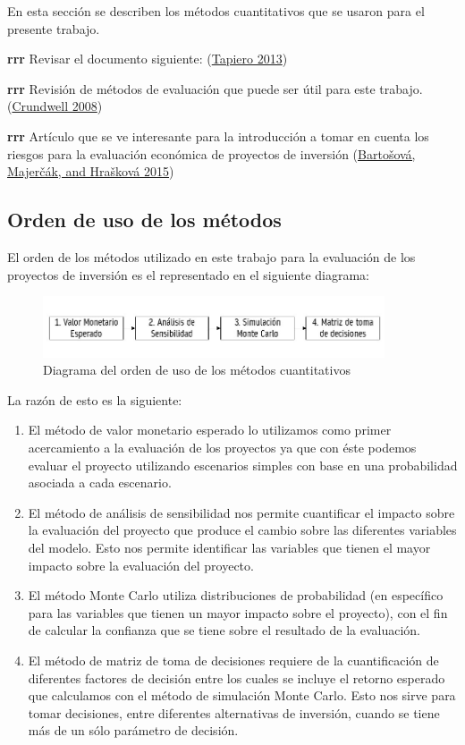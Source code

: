 \documentclass[
]{book}
\providecommand{\tightlist}{%
  \setlength{\itemsep}{0pt}\setlength{\parskip}{0pt}}
\begin{document}
En esta sección se describen los métodos cuantitativos que se usaron para el presente trabajo.

\textbf{rrr} Revisar el documento siguiente: (\protect\hyperlink{ref-Tapiero2013}{Tapiero 2013})

\textbf{rrr} Revisión de métodos de evaluación que puede ser útil para este trabajo. (\protect\hyperlink{ref-Crundwell2008}{Crundwell 2008})

\textbf{rrr} Artículo que se ve interesante para la introducción a tomar en cuenta los riesgos para la evaluación económica de proyectos de inversión (\protect\hyperlink{ref-Bartovsova2015}{Bartošová, Majerčák, and Hrašková 2015})

\hypertarget{orden-de-uso-de-los-muxe9todos}{%
\subsection{Orden de uso de los métodos}\label{orden-de-uso-de-los-muxe9todos}}

El orden de los métodos utilizado en este trabajo para la evaluación de los proyectos de inversión es el representado en el siguiente diagrama:

\begin{figure}
\centering
\includegraphics[width=0.9\textwidth,height=\textheight]{Diagramas/OrdenMetodos.jpg}
\caption{Diagrama del orden de uso de los métodos cuantitativos}
\end{figure}

La razón de esto es la siguiente:

\begin{enumerate}
\def\labelenumi{\arabic{enumi}.}
\tightlist
\item
  El método de valor monetario esperado lo utilizamos como primer acercamiento a la evaluación de los proyectos ya que con éste podemos evaluar el proyecto utilizando escenarios simples con base en una probabilidad asociada a cada escenario.
\item
  El método de análisis de sensibilidad nos permite cuantificar el impacto sobre la evaluación del proyecto que produce el cambio sobre las diferentes variables del modelo. Esto nos permite identificar las variables que tienen el mayor impacto sobre la evaluación del proyecto.
\item
  El método Monte Carlo utiliza distribuciones de probabilidad (en específico para las variables que tienen un mayor impacto sobre el proyecto), con el fin de calcular la confianza que se tiene sobre el resultado de la evaluación.
\item
  El método de matriz de toma de decisiones requiere de la cuantificación de diferentes factores de decisión entre los cuales se incluye el retorno esperado que calculamos con el método de simulación Monte Carlo. Esto nos sirve para tomar decisiones, entre diferentes alternativas de inversión, cuando se tiene más de un sólo parámetro de decisión.
\end{enumerate}
\end{document}
